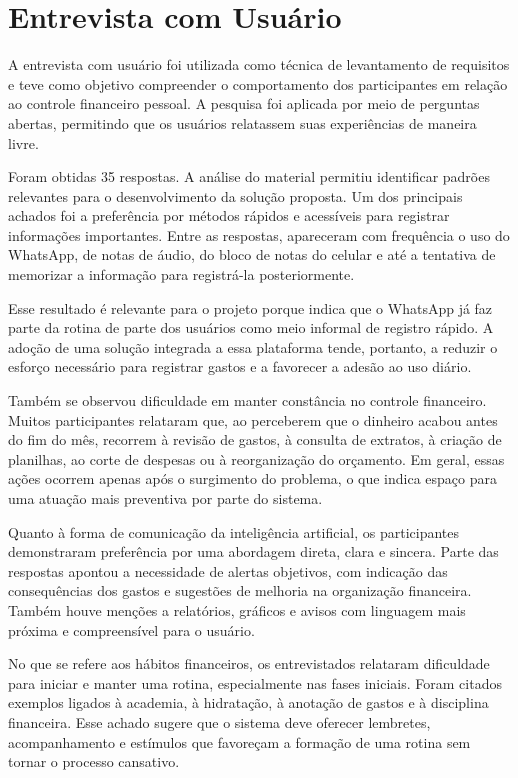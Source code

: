 \section{Entrevista com Usuário}

A entrevista com usuário foi utilizada como técnica de levantamento de requisitos e teve como objetivo compreender o comportamento dos participantes em relação ao controle financeiro pessoal. A pesquisa foi aplicada por meio de perguntas abertas, permitindo que os usuários relatassem suas experiências de maneira livre.

Foram obtidas 35 respostas. A análise do material permitiu identificar padrões relevantes para o desenvolvimento da solução proposta. Um dos principais achados foi a preferência por métodos rápidos e acessíveis para registrar informações importantes. Entre as respostas, apareceram com frequência o uso do WhatsApp, de notas de áudio, do bloco de notas do celular e até a tentativa de memorizar a informação para registrá-la posteriormente.

Esse resultado é relevante para o projeto porque indica que o WhatsApp já faz parte da rotina de parte dos usuários como meio informal de registro rápido. A adoção de uma solução integrada a essa plataforma tende, portanto, a reduzir o esforço necessário para registrar gastos e a favorecer a adesão ao uso diário.

Também se observou dificuldade em manter constância no controle financeiro. Muitos participantes relataram que, ao perceberem que o dinheiro acabou antes do fim do mês, recorrem à revisão de gastos, à consulta de extratos, à criação de planilhas, ao corte de despesas ou à reorganização do orçamento. Em geral, essas ações ocorrem apenas após o surgimento do problema, o que indica espaço para uma atuação mais preventiva por parte do sistema.

Quanto à forma de comunicação da inteligência artificial, os participantes demonstraram preferência por uma abordagem direta, clara e sincera. Parte das respostas apontou a necessidade de alertas objetivos, com indicação das consequências dos gastos e sugestões de melhoria na organização financeira. Também houve menções a relatórios, gráficos e avisos com linguagem mais próxima e compreensível para o usuário.

No que se refere aos hábitos financeiros, os entrevistados relataram dificuldade para iniciar e manter uma rotina, especialmente nas fases iniciais. Foram citados exemplos ligados à academia, à hidratação, à anotação de gastos e à disciplina financeira. Esse achado sugere que o sistema deve oferecer lembretes, acompanhamento e estímulos que favoreçam a formação de uma rotina sem tornar o processo cansativo.

